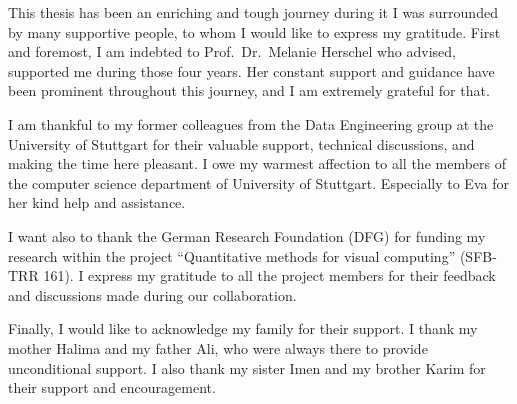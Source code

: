

This thesis has been an enriching and tough journey during it I was surrounded by many supportive people, to whom I would like to express my gratitude. 
First and foremost, I am indebted to Prof.~Dr.~Melanie Herschel who advised, supported me during those four years. 
Her constant support and guidance have been prominent throughout this journey, and I am extremely grateful for that.




I am thankful to my former colleagues from the Data Engineering group at the University of Stuttgart for their valuable support, technical discussions, and making the time here pleasant.
I owe my warmest affection to all the members of the computer science department of University of Stuttgart. Especially to Eva for her kind help and assistance. 

I want also to thank the German Research Foundation (DFG) for funding my research within the project ``Quantitative methods for visual computing'' (SFB-TRR 161). I express my gratitude to all the project members for their feedback and discussions made during our collaboration.

Finally, I would like to acknowledge my family for their support. I thank my mother Halima and my father Ali, who were always there to provide unconditional support.  I also thank my sister Imen and my brother Karim for their support and encouragement.